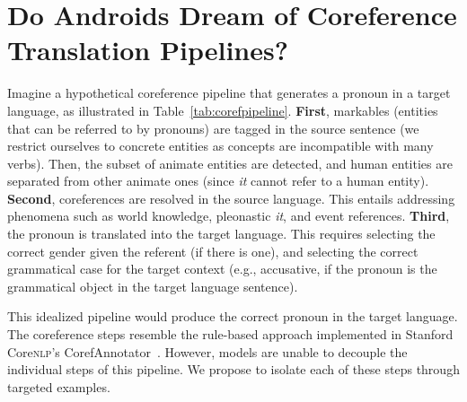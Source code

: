 \section{Do Androids Dream of Coreference Translation Pipelines?}
\label{sec:corefpipeline}

Imagine a hypothetical coreference pipeline that generates a pronoun in a target language, as illustrated in  Table~\ref{tab:corefpipeline}.
%
\textbf{First}, markables (entities that can be referred to by pronouns) are tagged in the source sentence (we restrict ourselves to concrete entities as concepts are incompatible with many verbs). 
%
Then, the subset of animate entities are detected, and human entities are separated from other animate ones (since \textit{it} cannot refer to a human entity).
%
\textbf{Second}, coreferences are resolved in the source language. 
%
This entails addressing phenomena such as world knowledge, pleonastic \textit{it}, and event references.  
%
\textbf{Third}, the pronoun is translated into the target language. This requires selecting the correct gender given the referent (if there is one), and selecting the correct grammatical case for the target context (e.g., accusative, if the pronoun is the grammatical object in the target language sentence).

This idealized
pipeline would produce the correct pronoun in the target language. 
%
The coreference steps resemble the rule-based approach implemented in Stanford Core\textsc{nlp}'s CorefAnnotator~\citep{raghunathan2010multi,lee2011stanford}. 
%
However, \nmt{} models are unable to decouple
the individual steps
of this pipeline. 
%
We propose to isolate each of these 
steps through targeted examples.

